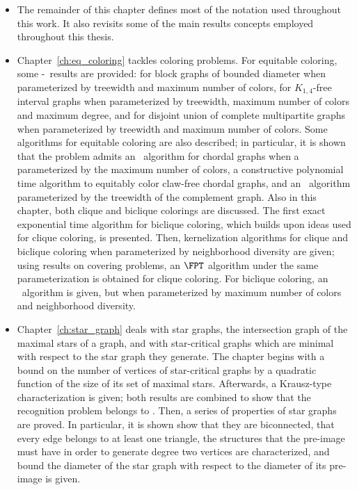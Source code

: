 \begin{itemize}
    \item The remainder of this chapter defines most of the notation used throughout this work.
    It also revisits some of the main results concepts employed throughout this thesis.
    \item Chapter~\ref{ch:eq_coloring} tackles coloring problems.
    For equitable coloring, some \W[1]-\Hness\ results are provided: for block graphs of bounded diameter when parameterized by treewidth and maximum number of colors, for $K_{1,4}$-free interval graphs when parameterized by treewidth, maximum number of colors and maximum degree, and for disjoint union of complete multipartite graphs when parameterized by treewidth and maximum number of colors.
    Some algorithms for equitable coloring are also described; in particular, it is shown that the problem admits an \XP\ algorithm for chordal graphs when a parameterized by the maximum number of colors, a constructive polynomial time algorithm to equitably color claw-free chordal graphs, and an \FPT\ algorithm parameterized by the treewidth of the complement graph.
    Also in this chapter, both clique and biclique colorings are discussed.
    The first exact exponential time algorithm for biclique coloring, which builds upon ideas used for clique coloring, is presented.
    Then, kernelization algorithms for clique and biclique coloring when parameterized by neighborhood diversity are given; using results on covering problems, an $\FPT$ algorithm under the same parameterization is obtained for clique coloring.
    For biclique coloring, an \FPT\ algorithm is given, but when parameterized by maximum number of colors and neighborhood diversity.
    \item Chapter~\ref{ch:star_graph} deals with star graphs, the intersection graph of the maximal stars of a graph, and with star-critical graphs which are minimal with respect to the star graph they generate.
    The chapter begins with a bound on the number of vertices of star-critical graphs by a quadratic function of the size of its set of maximal stars.
    Afterwards, a Krausz-type characterization is given; both results are combined to show that the recognition problem belongs to \NP.
    Then, a series of properties of star graphs are proved.
    In particular, it is shown show that they are biconnected, that every edge belongs to at least one triangle, the structures that the pre-image must have in order to generate degree two vertices are characterized, and bound the diameter of the star graph with respect to the diameter of its pre-image is given.

\end{itemize}
